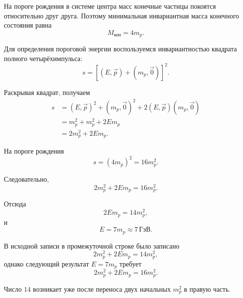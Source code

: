 \documentclass[../final.tex]{subfiles}
\begin{document}
На пороге рождения в системе центра масс конечные частицы покоятся
относительно друг друга. Поэтому минимальная инвариантная масса
конечного состояния равна
%
\begin{equation*}
    M_{\text{кон}}
    =
    4m_p.
\end{equation*}

Для определения пороговой энергии воспользуемся инвариантностью
квадрата полного четырёхимпульса:
%
\begin{equation*}
    s
    =
    \left[
        (E,\vec p)
        +
        (m_p,\vec 0)
    \right]^2.
\end{equation*}

Раскрывая квадрат, получаем
%
\begin{align*}
    s
    &=
    (E,\vec p)^2
    +
    (m_p,\vec 0)^2
    +
    2(E,\vec p)(m_p,\vec 0)
    \\[3pt]
    &=
    m_p^2
    +
    m_p^2
    +
    2Em_p
    \\[3pt]
    &=
    2m_p^2+2Em_p.
\end{align*}

На пороге рождения
%
\begin{equation*}
    s
    =
    (4m_p)^2
    =
    16m_p^2.
\end{equation*}

Следовательно,
%
\begin{equation*}
    2m_p^2+2Em_p
    =
    16m_p^2.
\end{equation*}

Отсюда
%
\begin{equation*}
    2Em_p
    =
    14m_p^2,
\end{equation*}
%
и
%
\begin{equation*}
    E
    =
    7m_p
    \approx
    7\,\text{ГэВ}.
\end{equation*}

\remark[Комментарий.]
В исходной записи в промежуточной строке было записано
%
\begin{equation*}
    2m_p^2+2Em_p
    =
    14m_p^2,
\end{equation*}
%
однако следующий результат $E=7m_p$ требует
%
\begin{equation*}
    2m_p^2+2Em_p
    =
    16m_p^2.
\end{equation*}

Число $14$ возникает уже после переноса двух начальных
$m_p^2$ в правую часть.


\end{document}
